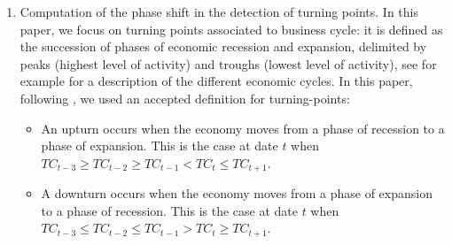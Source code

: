 \documentclass[
]{article}
\providecommand{\tightlist}{%
  \setlength{\itemsep}{0pt}\setlength{\parskip}{0pt}}\usepackage{longtable,booktabs,array}
\newcommand\1{\mathds{1}}
\begin{document}
\begin{enumerate}
\def\labelenumi{\arabic{enumi}.}
\item
  Computation of the phase shift in the detection of turning points. In
  this paper, we focus on turning points associated to business cycle:
  it is defined as the succession of phases of economic recession and
  expansion, delimited by peaks (highest level of activity) and troughs
  (lowest level of activity), see for example \textcite{ferrara} for a
  description of the different economic cycles. In this paper, following
  \textcite{Zellner1991}, we used an accepted definition for
  turning-points:

  \begin{itemize}
  \tightlist
  \item
    An upturn occurs when the economy moves from a phase of recession to
    a phase of expansion. This is the case at date \(t\) when
    \(TC_{t-3}\geq TC_{t-2}\geq TC_{t-1}<TC_t\leq TC_{t+1}\).\\
  \item
    A downturn occurs when the economy moves from a phase of expansion
    to a phase of recession. This is the case at date \(t\) when
    \(TC_{t-3}\leq TC_{t-2}\leq TC_{t-1}>TC_t\geq TC_{t+1}\).
  \end{itemize}


\end{enumerate}
\end{document}

